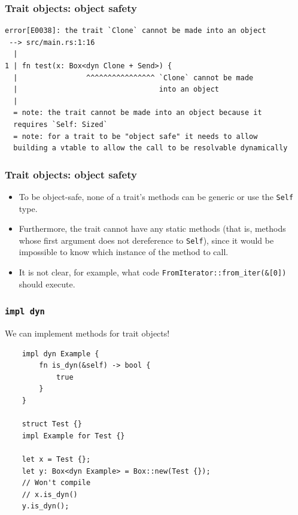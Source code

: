 \documentclass[aspectratio=1610,t]{beamer}
\begin{document}

\begin{frame}[fragile]
\frametitle{Trait objects: object safety}
\begin{verbatim}
error[E0038]: the trait `Clone` cannot be made into an object
 --> src/main.rs:1:16
  |
1 | fn test(x: Box<dyn Clone + Send>) {
  |                ^^^^^^^^^^^^^^^^ `Clone` cannot be made
  |                                 into an object
  |
  = note: the trait cannot be made into an object because it
  requires `Self: Sized`
  = note: for a trait to be "object safe" it needs to allow
  building a vtable to allow the call to be resolvable dynamically
\end{verbatim}
\end{frame}


\begin{frame}[fragile]
\frametitle{Trait objects: object safety}
\begin{itemize}
    \item To be object-safe, none of a trait's methods can be generic or use the \texttt{Self} type.
    \item Furthermore, the trait cannot have any static methods (that is, methods whose first argument does not dereference to \texttt{Self}), since it would be impossible to know which instance of the method to call.
    \item It is not clear, for example, what code \texttt{FromIterator::from\_iter(\&[0])} should execute.
\end{itemize}
\end{frame}


\begin{frame}[fragile]
\frametitle{\texttt{impl dyn}}
We can implement methods for trait objects!

\begin{verbatim}
    impl dyn Example {
        fn is_dyn(&self) -> bool {
            true
        }
    }

    struct Test {}
    impl Example for Test {}

    let x = Test {};
    let y: Box<dyn Example> = Box::new(Test {});
    // Won't compile
    // x.is_dyn()
    y.is_dyn();
\end{verbatim}
\end{frame}
\end{document}
